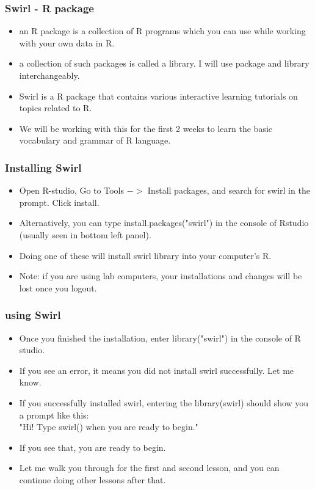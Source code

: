 \documentclass{beamer}
\begin{document}
\begin{frame}
\frametitle{Swirl - R package}
\begin{itemize}
\item an R package is a collection of R programs which you can use while working with your own data in R. 
\item a collection of such packages is called a library. I will use package and library interchangeably. \pause
\item Swirl is a R package that contains various interactive learning tutorials on topics related to R.
\item We will be working with this for the first 2 weeks to learn the basic vocabulary and grammar of R language.
\end{itemize}
\end{frame}

\begin{frame}
\frametitle{Installing Swirl}
\begin{itemize}
\item Open R-studio, Go to Tools $->$ Install packages, and search for swirl in the prompt. Click install.
\item Alternatively, you can type install.packages("swirl") in the console of Rstudio (usually seen in bottom left panel). 
\item Doing one of these will install swirl library into your computer's R.
\item Note: if you are using lab computers, your installations and changes will be lost once you logout. 
\end{itemize}
\end{frame}

\begin{frame}
\frametitle{using Swirl}
\begin{itemize}
\item Once you finished the installation, enter library("swirl") in the console of R studio.
\item If you see an error, it means you did not install swirl successfully. Let me know. 
\item If you successfully installed swirl, entering the library(swirl) should show you a prompt like this: \\  "Hi! Type swirl() when you are ready to begin."
\item If you see that, you are ready to begin.
\item Let me walk you through for the first and second lesson, and you can continue doing other lessons after that.
\end{itemize}
\end{frame}
\end{document}
